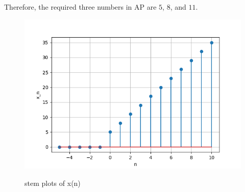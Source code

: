 \documentclass[journal,12pt,twocolumn]{IEEEtran}
\theoremstyle{remark}
\begin{document}
Therefore, the required three numbers in AP are $5$, $8$, and $11$.

\begin{figure}[h!]
  \centering
  \includegraphics[width=\columnwidth]{figs/stem_plot.png} 
  \label{fig:1}
  \caption{stem plots of x(n)}
\end{figure}
\end{document}

